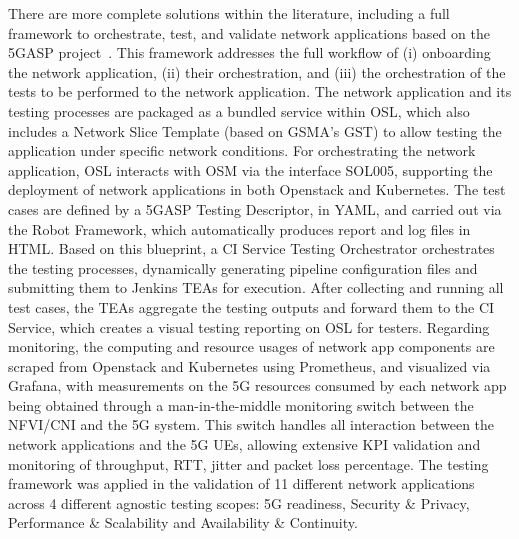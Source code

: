 There are more complete solutions within the literature, including a full framework to orchestrate, test, and validate network applications based on the 5GASP project~\cite{AutomatedTestingOrchestrationFramework}. This framework addresses the full workflow of (i) onboarding the network application, (ii) their orchestration, and (iii) the orchestration of the tests to be performed to the network application. The network application and its testing processes are packaged as a bundled service within \acs{OSL}, which also includes a Network Slice Template (based on \acs{GSMA}'s \acs{GST}) to allow testing the application under specific network conditions. For orchestrating the network application, \acs{OSL} interacts with \acs{OSM} via the interface SOL005, supporting the deployment of network applications in both Openstack and Kubernetes. The test cases are defined by a 5GASP Testing Descriptor, in \acs{YAML}, and carried out via the Robot Framework, which automatically produces report and log files in \acs{HTML}. Based on this blueprint, a \acs{CI} Service Testing Orchestrator orchestrates the testing processes, dynamically generating pipeline configuration files and submitting them to Jenkins \acfp{TEA} for execution. After collecting and running all test cases, the \acsp{TEA} aggregate the testing outputs and forward them to the \acs{CI} Service, which creates a visual testing reporting on \acs{OSL} for testers. Regarding monitoring, the computing and resource usages of network app components are scraped from Openstack and Kubernetes using Prometheus, and visualized via Grafana, with measurements on the \acs{5G} resources consumed by each network app being obtained through a man-in-the-middle monitoring switch between the \acs{NFVI}/\acs{CNI} and the \acs{5G} system. This switch handles all interaction between the network applications and the \acs{5G} \acsp{UE}, allowing extensive \acs{KPI} validation and monitoring of throughput, \acs{RTT}, jitter and packet loss percentage. The testing framework was applied in the validation of 11 different network applications across 4 different agnostic testing scopes: \acs{5G} readiness, Security \& Privacy, Performance \& Scalability and Availability \& Continuity.

